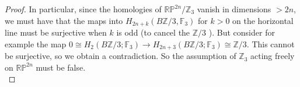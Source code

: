 \documentclass[reqno]{amsart}
\theoremstyle{definition}
\theoremstyle{remark}
\begin{document}
\begin{proof}
In particular,
since the homologies
of $\mathbb{R}\mathbb{P}^{2n}/ \mathbb{Z}_3$ vanish
in dimensions $>2n$, we must have that
the maps
into $H_{2n+k}\left( B\mathbb{Z}/3, \mathbb{F}_3 \right) $ 
for $k>0$
on the horizontal line must be surjective when
$k$ is odd (to cancel the $\mathbb{Z}/3$ ).
But consider for example the map
$0 \cong H_2 \left( B \mathbb{Z}/3; \mathbb{F}_3 \right) 
\to H_{2n+3}\left( B\mathbb{Z}/3; \mathbb{F}_3 \right) \cong
\mathbb{Z} / 3$. This cannot be surjective, so
we obtain a contradiction. So the
assumption of $\mathbb{Z}_3$ acting freely
on $\mathbb{R}\mathbb{P}^{2n}$ must be false.\\
\linebreak




    \end{proof}








\end{document}
